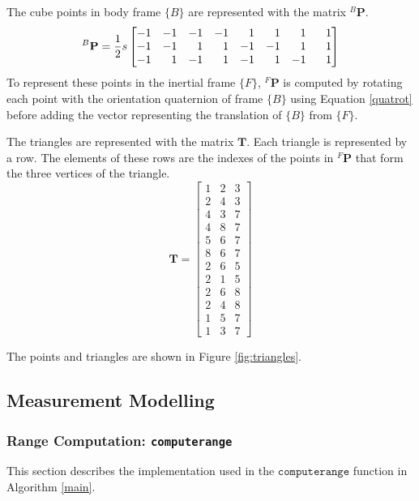 The cube points in body frame $\{B\}$ are represented with the matrix ${^{B}\mathbf{P}}$.
\begin{equation}
	{^{B}\mathbf{P}} = \frac{1}{2}s
	\begin{bmatrix*}[r]
		-1  &  -1  &  -1  &  -1  &   1  &   1  &   1  &  \hspace{0.75em} 1 \\
		-1  &  -1  &   1  &   1  &  -1  &  -1  &   1  &  1 \\
		-1  &   1  &  -1  &   1  &  -1  &   1  &  -1  &  1 
	\end{bmatrix*}
\end{equation}
To represent these points in the inertial frame $\{F\}$, ${^{F}\mathbf{P}}$ is computed by rotating each point with the orientation quaternion of frame $\{B\}$ using Equation \ref{quatrot} before adding the vector representing the translation of $\{B\}$ from $\{F\}$.

The triangles are represented with the matrix $\mathbf{T}$. Each triangle is represented by a row. The elements of these rows are the indexes of the points in ${^{F}\mathbf{P}}$ that form the three vertices of the triangle.
\begin{equation}
	\mathbf{T} = 
	\begin{bmatrix}
	1 & 2 & 3 \\
	2 & 4 & 3 \\
    4 & 3 & 7 \\
    4 & 8 & 7 \\
    5 & 6 & 7 \\
    8 & 6 & 7 \\
    2 & 6 & 5 \\
    2 & 1 & 5 \\
    2 & 6 & 8 \\
    2 & 4 & 8 \\
    1 & 5 & 7 \\
    1 & 3 & 7
	\end{bmatrix}
\end{equation}

The points and triangles are shown in Figure \ref{fig:triangles}.


\subsection{Measurement Modelling}
	\subsubsection{Range Computation: \texttt{computerange}}
	This section describes the implementation used in the $\texttt{computerange}$ function in Algorithm \ref{main}.
	
